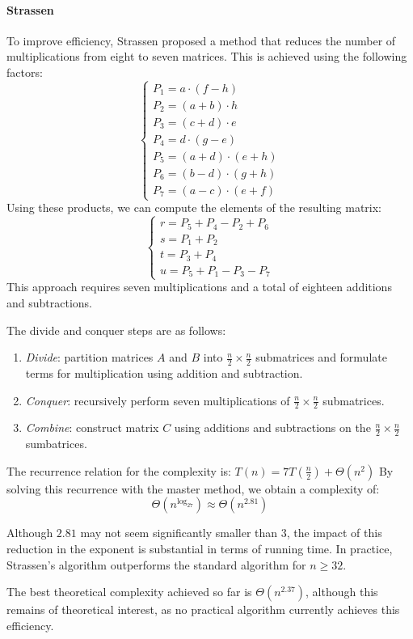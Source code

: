 \paragraph*{Strassen}
To improve efficiency, Strassen proposed a method that reduces the number of multiplications from eight to seven matrices.
This is achieved using the following factors:
\[\begin{cases} P_1=a\cdot(f-h) \\ P_2=(a+b)\cdot h \\ P_3=(c+d)\cdot e \\ P_4=d\cdot(g-e) \\ P_5=(a+d)\cdot(e+h) \\ P_6=(b-d)\cdot(g+h) \\ P_7=(a-c)\cdot(e+f) \end{cases}\]
Using these products, we can compute the elements of the resulting matrix:
\[\begin{cases} r=P_5+P_4-P_2+P_6 \\ s=P_1+P_2 \\ t=P_3+P_4 \\ u=P_5+P_1-P_3-P_7 \end{cases}\]
This approach requires seven multiplications and a total of eighteen additions and subtractions.

The divide and conquer steps are as follows:
\begin{enumerate}
    \item \textit{Divide}: partition matrices $A$ and $B$ into $\frac{n}{2}\times\frac{n}{2}$ submatrices and formulate terms for multiplication using addition and subtraction.
    \item \textit{Conquer}: recursively perform seven multiplications of $\frac{n}{2}\times\frac{n}{2}$ submatrices.
    \item \textit{Combine}: construct matrix $C$ using additions and subtractions on the $\frac{n}{2}\times\frac{n}{2}$ sumbatrices. 
\end{enumerate}
The recurrence relation for the complexity is: $T(n)=7T\left(\frac{n}{2}\right)+\Theta(n^2)$
By solving this recurrence with the master method, we obtain a complexity of:
\[\Theta\left(n^{\log_27}\right)\approx \Theta\left(n^{2.81}\right)\]

Although $2.81$ may not seem significantly smaller than $3$, the impact of this reduction in the exponent is substantial in terms of running time.
In practice, Strassen's algorithm outperforms the standard algorithm for $n \geq 32$.

The best theoretical complexity achieved so far is $\Theta\left(n^{2.37}\right)$, although this remains of theoretical interest, as no practical algorithm currently achieves this efficiency.